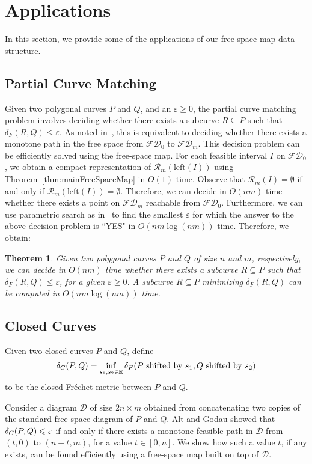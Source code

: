 \documentclass[12pt]{dalthesis}
\newtheorem{theorem}{Theorem}
\newcommand{\IR}{\ensuremath{\mathbb{R}}}
\newcommand{\lee}{\leqslant}
\newcommand{\gee}{\geqslant}
\newcommand{\eps}{\varepsilon}
\newcommand{\CR}{{\mathscr R}}
\newcommand{\Frechet}{Fr\'echet }
\newcommand{\distF}{\delta_F}
\newcommand{\Left}{\mbox{left}}
\newcommand{\fs}{free-space }
\newcommand{\FD}{\mathscr {FD}}
\newcommand{\CD}{{\mathscr D}}
\newcommand{\R}{\CR}
\begin{document}
\section{Applications} \label{sec:appl}

In this section, we provide some of the applications of our \fs map data structure.

\subsection{Partial Curve Matching\ }
Given two polygonal curves $P$ and $Q$, and an $\eps \gee 0$,
the partial curve matching problem involves
deciding whether there exists a subcurve $R \subseteq P$ such that $\distF(R,Q) \lee \eps$.
As noted in~\cite{AltG95}, 
this is equivalent to deciding whether 
there exists a monotone path in the free space from $\FD_0$ to $\FD_m$. 
This decision problem can be efficiently solved using the \fs map.
For each feasible interval $I$ on $\FD_0$,
we obtain a compact representation of $\R_m(\Left(I))$ using 
Theorem~\ref{thm:mainFreeSpaceMap} in $O(1)$ time.
Observe that $\R_m(I) = \emptyset$ if and only if 
$\R_m(\Left(I)) = \emptyset$.
Therefore, we can decide in $O(nm)$ time 
whether there exists a point on $\FD_m$ reachable from $\FD_0$.
Furthermore, we can use parametric search as in~\cite{AltG95}
to find the smallest $\eps$ for which the answer to the above decision problem is ``YES" in 
$O(nm \log (nm))$ time.
Therefore, we obtain:

\begin{theorem} \label{thm:partial}
	Given two polygonal curves $P$ and $Q$ of size $n$ and $m$, respectively,
	we can decide in $O(nm)$ time whether there exists a subcurve $R \subseteq P$ 
	such that $\distF(R,Q) \lee \eps$, for a given $\eps \gee 0$.
	A subcurve $R \subseteq P$ minimizing $\distF(R,Q)$ can be computed in $O(nm \log (nm))$ time.
\end{theorem}


\subsection{Closed Curves}
Given two closed curves $P$ and $Q$,
define
\[
	\distC(P,Q) = \inf_{s_1,s_2 \in \IR} \distF(P \mbox{ shifted by } s_1, Q \mbox{ shifted by } s_2)
\]
to be the closed \Frechet metric
between $P$ and $Q$. 


Consider a diagram $\CD$ of size $2n \times m$
obtained from concatenating two copies of the standard \fs diagram of $P$ and $Q$.
Alt and Godau showed that $\distC(P,Q) \lee \eps$ if and only if
there exists a monotone feasible path in $\CD$ from $(t,0)$ to $(n+t,m)$,
for a value $t \in [0,n]$.
We show how such a value $t$, if any exists,
can be found efficiently using a \fs map built on top of $\CD$.
\end{document}
